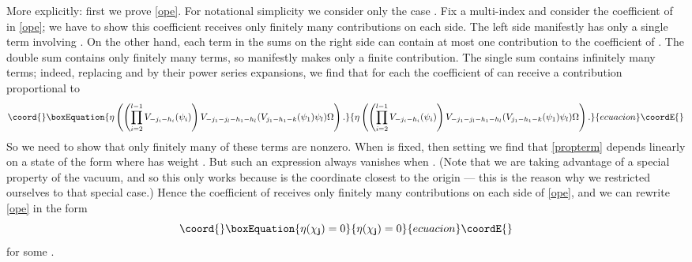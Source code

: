 \documentclass[a4paper,12pt]{article}
\providecommand{\jj}{{\mathbf j}}
\providecommand{\zz}{{\mathbf z}}
\providecommand{\F}{{\mathcal H}}
\providecommand{\IP}[1]{\langle#1\rangle}
\begin{document}
More explicitly:  first we prove \eqref{ope}.  For notational simplicity we consider only the case \coordHE{}.
Fix a multi-index \myHighlight{$\jj$}\coordHE{} and consider the coefficient of \myHighlight{$\zz^\jj$}\coordHE{} in \eqref{ope}; we have to show this
coefficient receives only finitely many contributions on each side.  The left side manifestly has only a single
term involving \myHighlight{$\zz^\jj$}\coordHE{}.  On the other hand, each term in the sums on the right side can contain at
most one contribution to the coefficient of \myHighlight{$\zz^\jj$}\coordHE{}.  The double sum contains only finitely many terms, so manifestly
makes only a finite contribution.  The single sum contains infinitely many terms; indeed,
replacing \coordHE{} and \myHighlight{$\IP{V(V_{-n-h_1}(\psi_1) \psi_l, z_l) \prod_{a \ne 1,l} V(\psi_a, z_a)}_{\eta,R}$}\coordHE{} by their power series expansions,
we find that for each \coordHE{} the coefficient of \myHighlight{$\zz^\jj$}\coordHE{} can receive a contribution proportional to
\begin{equation}\coord{}\boxEquation{ \label{propterm}
\eta \left( \left( \prod_{i=2}^{l-1} V_{-j_i-h_i}(\psi_i) \right) V_{- j_1 - j_l - h_1 - h_l}( V_{j_1 - h_1 - k}(\psi_1) \psi_l) \Omega \right).
}{ \eta \left( \left( \prod_{i=2}^{l-1} V_{-j_i-h_i}(\psi_i) \right) V_{- j_1 - j_l - h_1 - h_l}( V_{j_1 - h_1 - k}(\psi_1) \psi_l) \Omega \right).
}{ecuacion}\coordE{}\end{equation}
So we need to show that only finitely many of these terms are nonzero.
When \myHighlight{$\jj$}\coordHE{} is fixed, then setting \coordHE{} we find that 
\eqref{propterm} depends linearly on a state of the form \coordHE{} where
\coordHE{} has weight \coordHE{}.  But such an expression always vanishes when \coordHE{}.
(Note that we are taking advantage of a special property of the vacuum, and so 
this only works because \coordHE{} is the coordinate closest to the origin --- this is the 
reason why we restricted ourselves to that special case.)  
Hence the coefficient of \myHighlight{$\zz^\jj$}\coordHE{} receives only finitely
many contributions on each side of \eqref{ope}, and we can rewrite \eqref{ope} in the form
\begin{equation}\coord{}\boxEquation{ \label{ope2}
\eta(\chi_\jj) = 0
}{ \eta(\chi_\jj) = 0
}{ecuacion}\coordE{}\end{equation}
for some \myHighlight{$\chi_\jj \in \F$}\coordHE{}.
\end{document}
